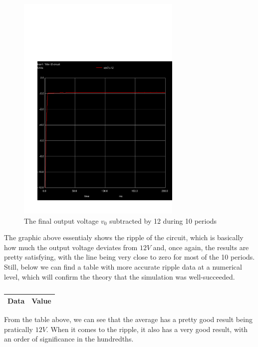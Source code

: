 \begin{figure}[H]\centering
\includegraphics[trim= 0cm 0cm 0cm 10cm, clip, width=0.7\textwidth]{trans3.pdf}
\caption{The final output voltage $v_0$ subtracted by 12 during 10 periods}
\label{fig:sim_outputdiff}
\end{figure}

The graphic above essentialy shows the ripple of the circuit, which is basically how much the output voltage deviates from $12V$ and, once again, the results are pretty satisfying, with the line being very close to zero for most of the 10 periods. Still, below we can find a table with more accurate ripple data at a numerical level, which will confirm the theory that the simulation was well-succeeded.


\begin{table}[H] \centering
  \begin{tabular}{|l|r|}
    \hline    
    {\bf Data} & {\bf Value} \\ \hline
    
  \end{tabular}
  \caption{}
 \label{tab:op}
\end{table}

 From the table above, we can see that the average has a pretty good result being pratically $12V$. When it comes to the ripple, it also has a very good result, with an order of significance in the hundredths.
